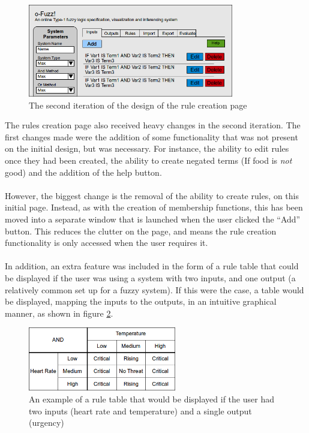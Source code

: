 \begin{figure}[ht!]
\begin{center}
\includegraphics[width=0.8\textwidth]{images/secondItRules}
\end{center}
\caption{The second iteration of the design of the rule creation page}
\label{fig:design-secondIterationRules}
\end{figure}
\noindent 
The rules creation page also received heavy changes in the second iteration. The first changes made were the addition of some functionality that was not present on the initial design, but was necessary. For instance, the ability to edit rules once they had been created, the ability to create negated terms (If food is \textit{not} good) and the addition of the help button.\ \\
\ \\
However, the biggest change is the removal of the ability to create rules, on this initial page. Instead, as with the creation of membership functions, this has been moved into a separate window that is launched when the user clicked the ``Add'' button. This reduces the clutter on the page, and means the rule creation functionality is only accessed when the user requires it.\ \\
\ \\
In addition, an extra feature was included in the form of a rule table that could be displayed if the user was using a system with two inputs, and one output (a relatively common set up for a fuzzy system). If this were the case, a table would be displayed, mapping the inputs to the outputs, in an intuitive graphical manner, as shown in figure \ref{fig:ruleTable}.

\begin{figure}[ht!]
\begin{center}
\includegraphics[width=0.575\textwidth]{images/ruletable}
\end{center}
\vspace{-4mm}
\caption{An example of a rule table that would be displayed if the user had two inputs (heart rate and temperature) and a single output (urgency)}
\label{fig:ruleTable}
\end{figure}

